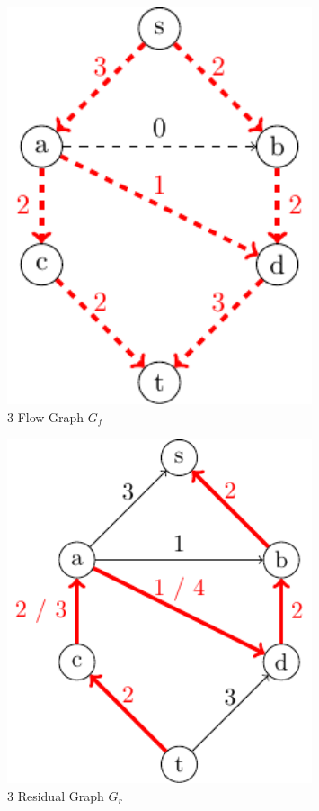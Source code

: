 \begin{minipage}{0.2\textwidth}
\begin{figure}[H]
  \centering
  \includegraphics[width=0.8\textwidth]{Figure/maxflow_d2_6.pdf}
  \caption*{3 Flow Graph \(G_f\)}
\end{figure}
\end{minipage}
\begin{minipage}{0.2\textwidth}
\begin{figure}[H]
  \centering
  \includegraphics[width=0.8\textwidth]{Figure/maxflow_d2_7.pdf}
  \caption*{3 Residual Graph \(G_r\)}
\end{figure}
\end{minipage}

